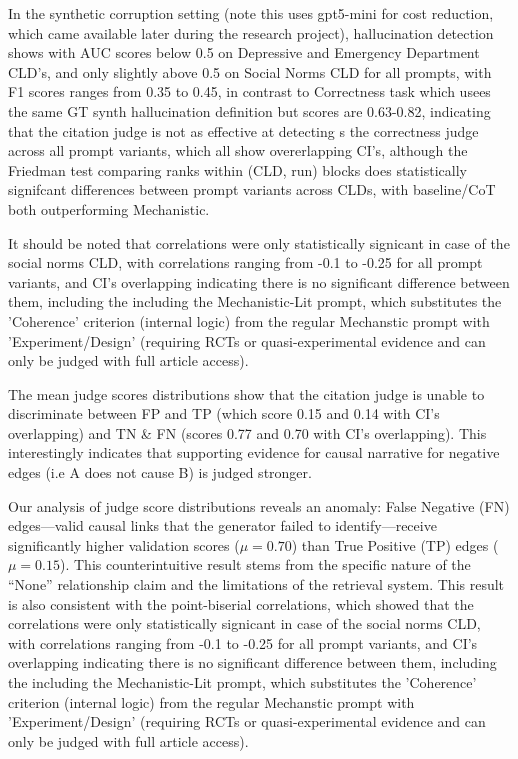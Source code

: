 In the synthetic corruption setting (note this uses gpt5-mini for cost reduction, which came available later during the research project), hallucination detection shows with AUC scores below 0.5 on Depressive and Emergency Department CLD's, and only slightly above 0.5 on Social Norms CLD for all prompts, with F1 scores ranges from 0.35 to 0.45, in contrast to Correctness task which usees the same GT synth hallucination definition but scores are 0.63-0.82, indicating that the citation judge is not as effective at detecting s the correctness judge across all prompt variants, which all show overerlapping CI's, although the Friedman test comparing ranks within (CLD, run) blocks does statistically signifcant differences between prompt variants across CLDs, with baseline/CoT both outperforming Mechanistic.

It should be noted that correlations were only statistically signicant in case of the social norms CLD, with correlations ranging from -0.1 to -0.25 for all prompt variants, and CI's overlapping indicating there is no significant difference between them, including the including the Mechanistic-Lit prompt, which substitutes the 'Coherence' criterion (internal logic) from the regular Mechanstic prompt with 'Experiment/Design' (requiring RCTs or quasi-experimental evidence and can only be judged with full article access).

The mean judge scores distributions show that the citation judge is unable to discriminate between FP and TP (which score 0.15 and 0.14 with CI's overlapping) and TN & FN (scores 0.77 and 0.70 with CI's overlapping).
This interestingly indicates that supporting evidence for causal narrative for negative edges (i.e A does not cause B) is judged stronger.

Our analysis of judge score distributions reveals an anomaly: False Negative (FN) edges---valid causal links that the generator failed to identify---receive significantly higher validation scores ($\mu=0.70$) than True Positive (TP) edges ($\mu=0.15$). This counterintuitive result stems from the specific nature of the ``None'' relationship claim and the limitations of the retrieval system. This result is also consistent with the point-biserial correlations, which showed that the correlations were only statistically signicant in case of the social norms CLD, with correlations ranging from -0.1 to -0.25 for all prompt variants, and CI's overlapping indicating there is no significant difference between them, including the including the Mechanistic-Lit prompt, which substitutes the 'Coherence' criterion (internal logic) from the regular Mechanstic prompt with 'Experiment/Design' (requiring RCTs or quasi-experimental evidence and can only be judged with full article access).

